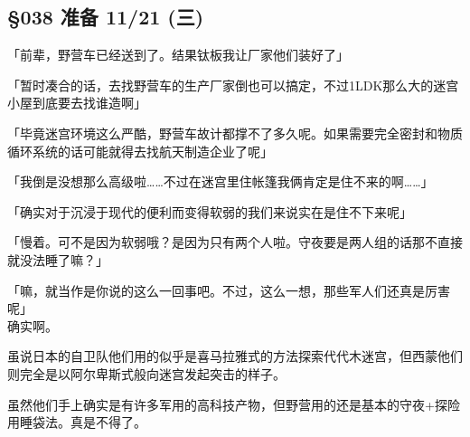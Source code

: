 \subsection{§038 准备 11/21 (三)}

「前辈，野营车已经送到了。结果钛板我让厂家他们装好了」

「暂时凑合的话，去找野营车的生产厂家倒也可以搞定，不过1LDK那么大的迷宫小屋到底要去找谁造啊」

「毕竟迷宫环境这么严酷，野营车故计都撑不了多久呢。如果需要完全密封和物质循环系统的话可能就得去找航天制造企业了呢」

「我倒是没想那么高级啦……不过在迷宫里住帐篷我俩肯定是住不来的啊……」

「确实对于沉浸于现代的便利而变得软弱的我们来说实在是住不下来呢」

「慢着。可不是因为软弱哦？是因为只有两个人啦。守夜要是两人组的话那不直接就没法睡了嘛？」

「嘛，就当作是你说的这么一回事吧。不过，这么一想，那些军人们还真是厉害呢」\\

确实啊。

虽说日本的自卫队他们用的似乎是喜马拉雅式的方法探索代代木迷宫，但西蒙他们则完全是以阿尔卑斯式般向迷宫发起突击的样子。

虽然他们手上确实是有许多军用的高科技产物，但野营用的还是基本的守夜+探险用睡袋法。真是不得了。\\

